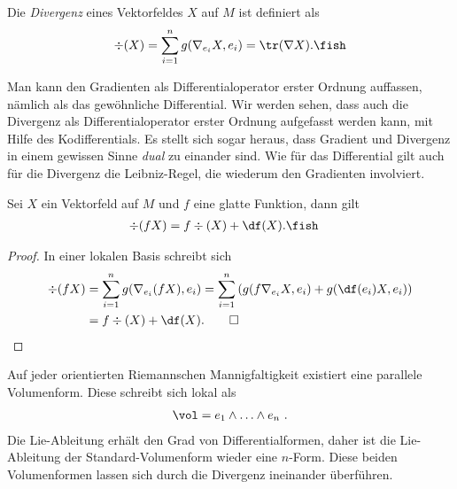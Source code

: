\documentclass[%
	paper=a5,%
	fleqn,%
	DIV=18,%
	BCOR=0mm,
	fontsize=11pt,
	titlepage=false,%
	bibliography=totoc,
	DIV=18,%
	twoside=true,
	pdftitle=Riemannsche Geometrie,
	pdfauthor=Uwe Semmelmann,
	numbers=noendperiod]%
	{scrbook}
\begin{document}
\begin{defn}
Die \emph{Divergenz} eines Vektorfeldes $X$ auf $M$ ist definiert als
\begin{align*}
\div(X) = \sum_{i=1}^n g(\nabla_{e_{i}} X,e_{i}) = \tr(\nabla X).\fish
\end{align*}
\end{defn}

Man kann den Gradienten als Differentialoperator erster Ordnung auffassen, nämlich als das gewöhnliche Differential. Wir werden sehen, dass auch die Divergenz als Differentialoperator erster Ordnung aufgefasst werden kann, mit Hilfe des Kodifferentials. Es stellt sich sogar heraus, dass Gradient und Divergenz in einem gewissen Sinne \textit{dual} zu einander sind. Wie für das Differential gilt auch für die Divergenz die Leibniz-Regel, die wiederum den Gradienten involviert.

\begin{lem}
Sei $X$ ein Vektorfeld auf $M$ und $f$ eine glatte Funktion, dann gilt
\begin{align*}
\div (fX ) &= f \div(X) + \df(X).\fish
\end{align*}
\end{lem}
\begin{proof}
In einer lokalen Basis schreibt sich
\begin{align*}
\div(fX) &= \sum_{i=1}^n g(\nabla_{e_{i}}(fX),e_{i})
=
\sum_{i=1}^n \left(g(f\nabla_{e_{i}}X,e_{i})
+ g(\df(e_{i})X,e_{i})\right)\\
&= f\div(X) + \df(X).\qed
\end{align*}
\end{proof}

Auf jeder orientierten Riemannschen Mannigfaltigkeit existiert eine parallele Volumenform. Diese schreibt sich lokal als
\begin{align*}
\vol = e_{1}\wedge \ldots \wedge e_{n} \ .
\end{align*}
Die Lie-Ableitung erhält den Grad von Differentialformen, daher ist die Lie-Ableitung der Standard-Volumenform wieder eine $n$-Form. Diese beiden Volumenformen lassen sich durch die Divergenz ineinander überführen.
\end{document}
